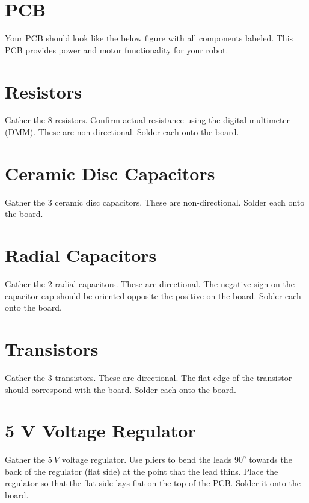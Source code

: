 \documentclass{handout}
\begin{document}
\newpage
\clearpage
\pagebreak
	
	\section{PCB}
	Your PCB should look like the below figure with all components labeled. This PCB provides power and motor functionality for your robot.

	
	
	\section{Resistors}
	Gather the 8 resistors. Confirm actual resistance using the digital multimeter (DMM). These are non-directional. Solder each onto the board.
	

	
	\section{Ceramic Disc Capacitors}
	Gather the 3 ceramic disc capacitors. These are non-directional. Solder each onto the board.

	
	\newpage
	\clearpage
	\pagebreak
	
	\section{Radial Capacitors}
	Gather the 2 radial capacitors. These are directional. The negative sign on the capacitor cap should be oriented opposite the positive on the board. Solder each onto the board.


	\section{Transistors}
	Gather the 3 transistors. These are directional. The flat edge of the transistor should correspond with the board. Solder each onto the board.

	\section{5 V Voltage Regulator}
	Gather the $5\ V$ voltage regulator. Use pliers to bend the leads $90^o$ towards the back of the regulator (flat side) at the point that the lead thins. Place the regulator so that the flat side lays flat on the top of the PCB. Solder it onto the board.


\newpage
\clearpage
\pagebreak
\end{document}
